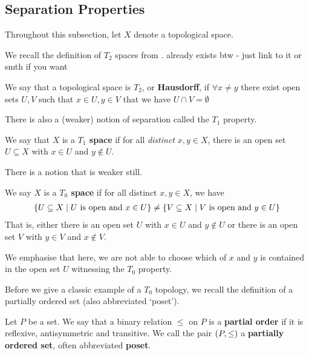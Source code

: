 \subsection{Separation Properties}

Throughout this subsection, let $X$ denote a topological space.

We recall the definition of $T_2$ spaces from .
 already exists btw - just link to it or smth if you want
\begin{boxdefinition}
    We say that a topological space is \textbf{$T_2$}, or \textbf{Hausdorff}, if $\forall x\neq y$ there exist open sets $U, V$ such that $x\in U, y \in V$ that we have $U\cap V=\emptyset$
\end{boxdefinition}

There is also a (weaker) notion of separation called the $T_1$ property.

\begin{boxdefinition}[$T_1$ property]
    We say that $X$ is a \textbf{$T_1$ space} if for all \textit{distinct} $x, y \in X$, there is an open set $U \subseteq X$ with $x \in U$ and $y \notin U$.
\end{boxdefinition} 

There is a notion that is weaker still.

\begin{boxdefinition}[$T_0$ property]
    We say $X$ is a \textbf{$T_0$ space} if for all distinct $x, y \in X$, we have
    \begin{align*}
        \left\{ U \subseteq X \; \middle\vert \; U \text{ is open and } x \in U \right\}
        \neq
        \left\{ V \subseteq X \; \middle\vert \; V \text{ is open and } y \in U \right\}
    \end{align*}
    That is, either there is an open set $U$ with $x \in U$ and $y \notin U$ or there is an open set $V$ with $y \in V$ and $x \notin V$.
\end{boxdefinition}
\begin{remark}
    We emphasise that here, we are not able to choose which of $x$ and $y$ is contained in the open set $U$ witnessing the $T_0$ property.
\end{remark}

Before we give a classic example of a $T_0$ topology, we recall the definition of a partially ordered set (also abbreviated `poset').

\begin{boxdefinition}
    Let $P$ be a set. We say that a binary relation $\leq$ on $P$ is a \textbf{partial order} if it is reflexive, antisymmetric and transitive. We call the pair $\left( P, \leq \right)$ a \textbf{partially ordered set}, often abbreviated \textbf{poset}.
\end{boxdefinition}

